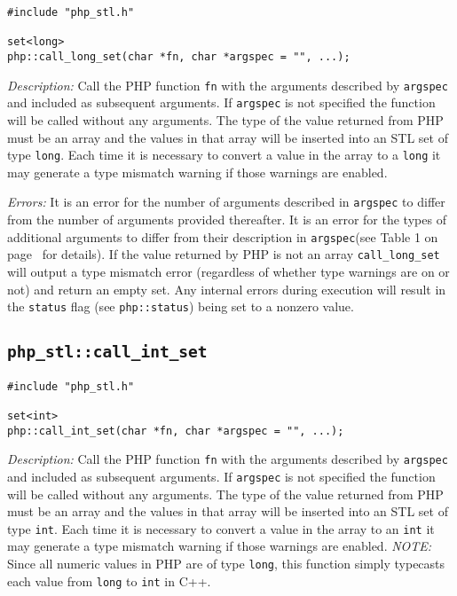 \documentclass[11pt,titlepage]{article}
\begin{document}
\begin{verbatim}
#include "php_stl.h"

set<long> 
php::call_long_set(char *fn, char *argspec = "", ...);
\end{verbatim}

\emph{Description:} Call the PHP function \verb|fn| with the arguments described by \verb|argspec| and included as subsequent arguments. If \verb|argspec| is not specified the function will be called without any arguments. The type of the value returned from PHP must be an array and the values in that array will be inserted into an STL set of type \verb|long|. Each time it is necessary to convert a value in the array to a \verb|long| it may generate a type mismatch warning if those warnings are enabled.

\emph{Errors:} It is an error for the number of arguments described in \verb|argspec| to differ from the number of arguments provided thereafter. It is an error for the types of additional arguments to differ from their description in \verb|argspec|(see Table 1 on page~\pageref{Table1} for details). If the value returned by PHP is not an array \verb|call_long_set| will output a type mismatch error (regardless of whether type warnings are on or not) and return an empty set. Any internal errors during execution will result in the \verb|status| flag (see \verb|php::status|) being set to a nonzero value.


\subsection{\texttt{php\_stl::call\_int\_set}}

\begin{verbatim}
#include "php_stl.h"

set<int> 
php::call_int_set(char *fn, char *argspec = "", ...);
\end{verbatim}

\emph{Description:} Call the PHP function \verb|fn| with the arguments described by \verb|argspec| and included as subsequent arguments. If \verb|argspec| is not specified the function will be called without any arguments. The type of the value returned from PHP must be an array and the values in that array will be inserted into an STL set of type \verb|int|. Each time it is necessary to convert a value in the array to an \verb|int| it may generate a type mismatch warning if those warnings are enabled. \emph{NOTE:} Since all numeric values in PHP are of type \verb|long|, this function simply typecasts each value from \verb|long| to \verb|int| in C++.
\end{document}
